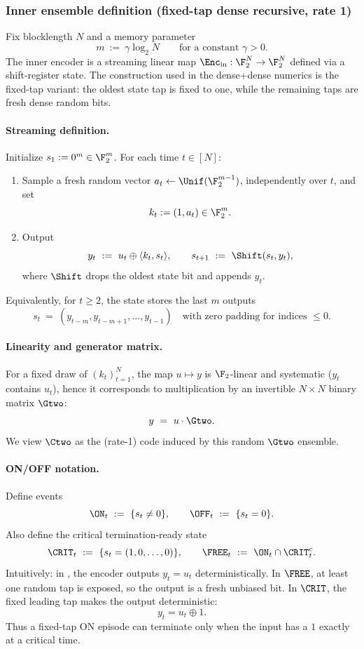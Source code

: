 \subsubsection{Inner ensemble definition (fixed-tap dense recursive, rate 1)}
\label{subsec:inner-dense-def}

Fix blocklength $N$ and a memory parameter
\[
m \ :=\ \gamma \log_2 N
\qquad\text{for a constant }\gamma>0.
\]
The inner encoder is a streaming linear map $\Enc_{\mathrm{in}}:\F_2^N\to\F_2^N$ defined via a shift-register state.
The construction used in the dense+dense numerics is the fixed-tap variant: the oldest state tap is fixed to one,
while the remaining taps are fresh dense random bits.

\paragraph{Streaming definition.}
Initialize $s_1:=0^m\in\F_2^m$.
For each time $t\in[N]$:
\begin{enumerate}
\item Sample a fresh random vector \(a_t\gets\Unif(\F_2^{m-1})\), independently over \(t\), and set
\[
k_t := (1,a_t)\in \F_2^m.
\]
\item Output
\begin{equation}
\label{eq:dense-inner-def}
y_t \ :=\ u_t \oplus \langle k_t, s_t\rangle,
\qquad
s_{t+1}\ :=\ \Shift(s_t,y_t),
\end{equation}
where $\Shift$ drops the oldest state bit and appends $y_t$.
\end{enumerate}
Equivalently, for $t\ge 2$, the state stores the last $m$ outputs
\[
s_t \ =\ (y_{t-m},y_{t-m+1},\dots,y_{t-1})
\quad\text{with zero padding for indices }\le 0.
\]

\paragraph{Linearity and generator matrix.}
For a fixed draw of $(k_t)_{t=1}^N$, the map $u\mapsto y$ is $\F_2$-linear and systematic ($y_t$ contains $u_t$),
hence it corresponds to multiplication by an invertible $N\times N$ binary matrix $\Gtwo$:
\[
y \ =\ u \cdot \Gtwo.
\]
We view $\Ctwo$ as the (rate-1) code induced by this random $\Gtwo$ ensemble.

\paragraph{ON/OFF notation.}
Define events
\[
\ON_t \ :=\ \{s_t\neq 0\},
\qquad
\OFF_t\ :=\ \{s_t=0\}.
\]
Also define the critical termination-ready state
\[
\CRIT_t \ :=\ \{s_t=(1,0,\dots,0)\},
\qquad
\FREE_t \ :=\ \ON_t\cap \CRIT_t^c.
\]
Intuitively: in \OFF, the encoder outputs $y_t=u_t$ deterministically. In \(\FREE\), at least one random tap is exposed,
so the output is a fresh unbiased bit. In \(\CRIT\), the fixed leading tap makes the output deterministic:
\[
y_t = u_t\oplus 1.
\]
Thus a fixed-tap ON episode can terminate only when the input has a \(1\) exactly at a critical time.

